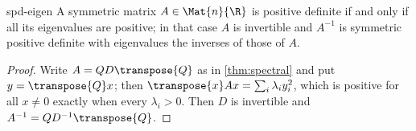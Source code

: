 \begin{corollary}{}{spd-eigen}
A symmetric matrix $A\in\Mat{n}{\R}$ is positive definite if and only if all its
eigenvalues are positive; in that case $A$ is invertible and $A^{-1}$ is
symmetric positive definite with eigenvalues the inverses of those of $A$.
\end{corollary}

\begin{proof}
Write $A=QD\transpose{Q}$ as in \cref{thm:spectral} and put $y=\transpose{Q}x$;
then $\transpose{x}Ax=\sum_i\lambda_i y_i^{2}$, which is positive for all
$x\neq0$ exactly when every $\lambda_i>0$. Then $D$ is invertible and
$A^{-1}=QD^{-1}\transpose{Q}$.
\end{proof}
